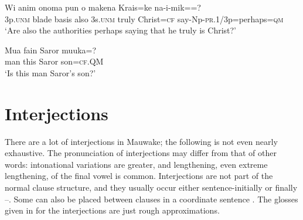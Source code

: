 \ea%
\label{ex:3:x793}
\gll Wi anim onoma pun o makena Krais=ke na-i-mik==?\\
3p.\textsc{unm} blade basis also 3s.\textsc{unm} truly Christ=\textsc{cf} say-Np-\textsc{pr}.1/3p=perhaps=\textsc{qm}\\
\glt`Are also the authorities perhaps saying that he truly is Christ?'
\z

\ea%
\label{ex:3:x794}
\gll Mua fain Saror muuka=? \\
man this Saror son=\textsc{cf}.QM\\
\glt`Is this man Saror's son?'
\z

\section{Interjections}\label{sec:3:13}
{}
There are a lot of interjections in Mauwake; the following  is not even nearly exhaustive. The pronunciation of interjections may differ from that of other words: intonational variations are greater, and lengthening, even extreme lengthening, of the final vowel is common. Interjections are not part of the normal clause structure, and they usually occur either sentence-initially or finally --. Some can also be placed between clauses in a coordinate sentence . The glosses given in  for the interjections are just rough approximations. 


